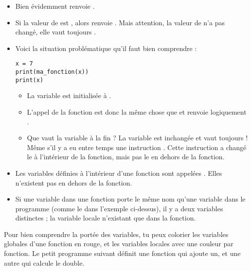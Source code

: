 \documentclass[11pt,class=report,crop=false]{standalone}
\begin{document}
\begin{itemize}
  \item Bien évidemment  renvoie .
  
  \item Si la valeur de  est , alors  renvoie . Mais attention, la valeur de  n'a pas changé, elle vaut toujours .
  
  \item Voici la situation problématique qu'il faut bien comprendre :
 \begin{center}
\begin{lstlisting}
x = 7
print(ma_fonction(x))
print(x)
\end{lstlisting}
\end{center}
  \begin{itemize}
    \item La variable  est initialisée à .
    
    \item L'appel de la fonction  est donc la même chose que 
      et renvoie logiquement .
     
    
    \item Que vaut la variable  à la fin ? La variable  est inchangée et vaut toujours  ! Même s'il y a eu entre temps une instruction . Cette instruction a changé le  à l'intérieur de la fonction, mais  pas le  en dehors de la fonction.
\end{itemize}   
\end{itemize} 
 
\bigskip

\begin{itemize}
  \item Les variables définies à l'intérieur d'une fonction sont appelées 
. 
Elles n'existent pas en dehors de la fonction.
  
  \item Si une variable dans une fonction porte le même nom qu'une variable dans le programme (comme le  dans l'exemple ci-dessus),  il y a deux variables distinctes ; la variable locale n'existant que dans la fonction.
  
\end{itemize}


Pour bien comprendre la portée des variables, tu peux colorier les variables globales d'une fonction en rouge, et les variables locales avec une couleur par fonction.
Le petit programme suivant définit une fonction qui ajoute un, et une autre qui calcule le double.
\end{document}
